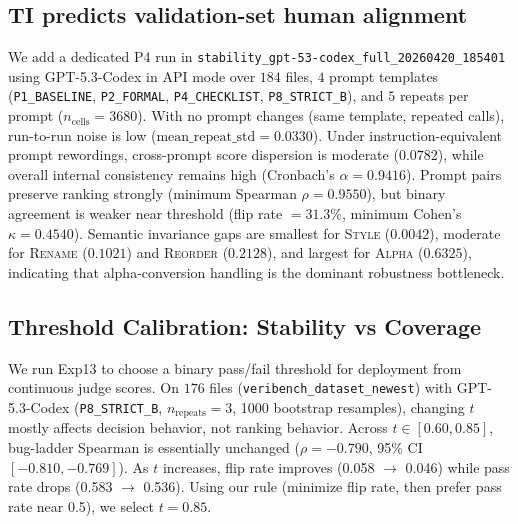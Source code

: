 \documentclass{article}
\begin{document}
\subsection{TI predicts validation-set human alignment}
We add a dedicated P4 run in \texttt{stability\_gpt-53-codex\_full\_20260420\_185401} using GPT-5.3-Codex in API mode over \(184\) files, \(4\) prompt templates (\texttt{P1\_BASELINE}, \texttt{P2\_FORMAL}, \texttt{P4\_CHECKLIST}, \texttt{P8\_STRICT\_B}), and \(5\) repeats per prompt (\(n_\text{cells}=3680\)).
With no prompt changes (same template, repeated calls), run-to-run noise is low (\(\text{mean\_repeat\_std}=0.0330\)).
Under instruction-equivalent prompt rewordings, cross-prompt score dispersion is moderate (\(0.0782\)), while overall internal consistency remains high (Cronbach's \(\alpha=0.9416\)).
Prompt pairs preserve ranking strongly (minimum Spearman \(\rho=0.9550\)), but binary agreement is weaker near threshold (flip rate \(=31.3\%\), minimum Cohen's \(\kappa=0.4540\)).
Semantic invariance gaps are smallest for \textsc{Style} (\(0.0042\)), moderate for \textsc{Rename} (\(0.1021\)) and \textsc{Reorder} (\(0.2128\)), and largest for \textsc{Alpha} (\(0.6325\)), indicating that alpha-conversion handling is the dominant robustness bottleneck.

\subsection{Threshold Calibration: Stability vs Coverage}
We run Exp13 to choose a binary pass/fail threshold for deployment from continuous judge scores.
On \(176\) files (\texttt{veribench\_dataset\_newest}) with GPT-5.3-Codex (\texttt{P8\_STRICT\_B}, \(n_\text{repeats}=3\), 1000 bootstrap resamples), changing \(t\) mostly affects decision behavior, not ranking behavior.
Across \(t\in[0.60,0.85]\), bug-ladder Spearman is essentially unchanged (\(\rho=-0.790\), 95\% CI \([-0.810,-0.769]\)).
As \(t\) increases, flip rate improves (0.058 \(\rightarrow\) 0.046) while pass rate drops (0.583 \(\rightarrow\) 0.536).
Using our rule (minimize flip rate, then prefer pass rate near 0.5), we select \(t=0.85\).
\end{document}
